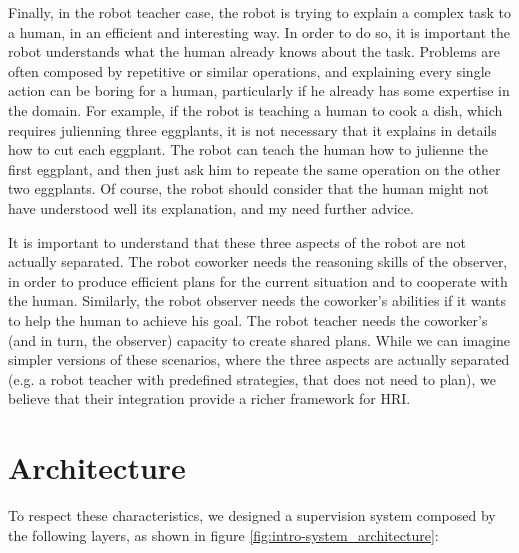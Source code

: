Finally, in the robot teacher case, the robot is trying to explain a complex task to a human, in an efficient and interesting way. In order to do so, it is important the robot understands what the human already knows about the task. Problems are often composed by repetitive or similar operations, and explaining every single action can be boring for a human, particularly if he already has some expertise in the domain. For example, if the robot is teaching a human to cook a dish, which requires julienning three eggplants, it is not necessary that it explains in details how to cut each eggplant. The robot can teach the human how to julienne the first eggplant, and then just ask him to repeate the same operation on the other two eggplants. Of course, the robot should consider that the human might not have understood well its explanation, and my need further advice.  

It is important to understand that these three aspects of the robot are not actually separated. The robot coworker needs the reasoning skills of the observer, in order to produce efficient plans for the current situation and to cooperate with the human. Similarly, the robot observer needs the coworker's abilities if it wants to help the human to achieve his goal. The robot teacher needs the coworker's (and in turn, the observer) capacity to create shared plans. While we can imagine simpler versions of these scenarios, where the three aspects are actually separated (e.g. a robot teacher with predefined strategies, that does not need to plan), we believe that their integration provide a richer framework for HRI.


\section{Architecture}
\label{sec:overview-architecture}
To respect these characteristics, we designed a supervision system composed by the following layers, as shown in figure \ref{fig:intro-system_architecture}:

